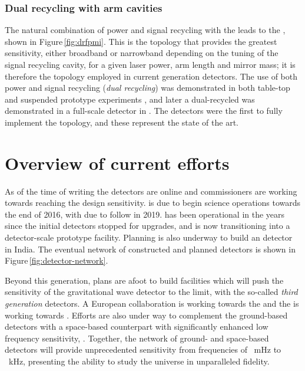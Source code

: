 \subsubsection{Dual recycling with \FP{} arm cavities}
The natural combination of power and signal recycling with the \FPMI{} leads to the \emph{\DRFPMI{}}, shown in Figure\,\ref{fig:drfpmi}. This is the topology that provides the greatest sensitivity, either broadband or narrowband depending on the tuning of the signal recycling cavity, for a given laser power, arm length and mirror mass; it is therefore the topology employed in current generation detectors. The use of both power and signal recycling (\emph{dual recycling}) was demonstrated in both table-top and suspended prototype experiments \cite{Strain1991, Heinzel1998, Freise2000}, and later a dual-recycled \MI{} was demonstrated in a full-scale detector in \GEO{} \cite{Heinzel2002, Grote2004}. The \ALIGO{} detectors were the first to fully implement the \DRFPMI{} topology, and these represent the state of the art.

\section{Overview of current efforts}
As of the time of writing the \ALIGO{} detectors are online and commissioners are working towards reaching the design sensitivity. \AVIRGO{} is due to begin science operations towards the end of 2016, with \KAGRA{} due to follow in 2019. \GEOHF{} has been operational in the years since the initial detectors stopped for upgrades, and is now transitioning into a detector-scale prototype facility. Planning is also underway to build an \ALIGO{} detector in India. The eventual network of constructed and planned detectors is shown in Figure\,\ref{fig:detector-network}.

Beyond this generation, plans are afoot to build facilities which will push the sensitivity of the gravitational wave detector to the limit, with the so-called \emph{third generation} detectors. A European collaboration is working towards the \emph{\ET{}} \cite{ET2011} and the \LSC{} is working towards \emph{\LIGOCE{}} \cite{Dwyer2015}. Efforts are also under way to complement the ground-based detectors with a space-based counterpart with significantly enhanced low frequency sensitivity, \emph{\ELISA{}}. Together, the network of ground- and space-based detectors will provide unprecedented sensitivity from frequencies of \SI{}{\milli\hertz} to \SI{}{\kilo\hertz}, presenting the ability to study the universe in unparalleled fidelity.

